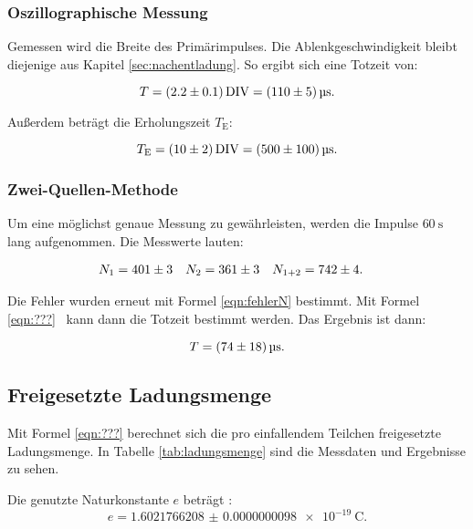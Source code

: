 \subsubsection{Oszillographische Messung}

Gemessen wird die Breite des Primärimpulses. Die Ablenkgeschwindigkeit bleibt diejenige aus
Kapitel \ref{sec:nachentladung}.
So ergibt sich eine Totzeit von:

\begin{equation*}
  T = \SI{2.2+-0.1}{\text{DIV}} = \SI{110+-5}{\micro\second}.
\end{equation*}

Außerdem beträgt die Erholungszeit $T_\text{E}$:

\begin{equation*}
  T_\text{E} = \SI{10+-2}{\text{DIV}} = \SI{500+-100}{\micro\second}.
\end{equation*}

\subsubsection{Zwei-Quellen-Methode}

Um eine möglichst genaue Messung zu gewährleisten, werden die Impulse $\SI{60}{\second}$ lang
aufgenommen. Die Messwerte lauten:

\begin{align*}
  N_1 &= \num{401+-3} & N_2 &= \num{361+-3} & N_{1+2} &= \num{742+-4}.
\end{align*}

Die Fehler wurden erneut mit Formel \eqref{eqn:fehlerN} bestimmt. Mit Formel \eqref{eqn:???}%
~kann dann die Totzeit bestimmt werden. Das Ergebnis ist dann:

\begin{equation*}
  T = \SI{74+-18}{\micro\second}.
\end{equation*}

\subsection{Freigesetzte Ladungsmenge}

Mit Formel \eqref{eqn:???}%
berechnet sich die pro einfallendem Teilchen freigesetzte Ladungsmenge.
In Tabelle \ref{tab:ladungsmenge} sind die Messdaten und Ergebnisse zu sehen.

Die genutzte Naturkonstante $\si{\elementarycharge}$ beträgt \cite{codata}:
\begin{equation}
  \si{\elementarycharge} =  \SI{1.6021766208(98)e-19}{\coulomb}.
\end{equation}

